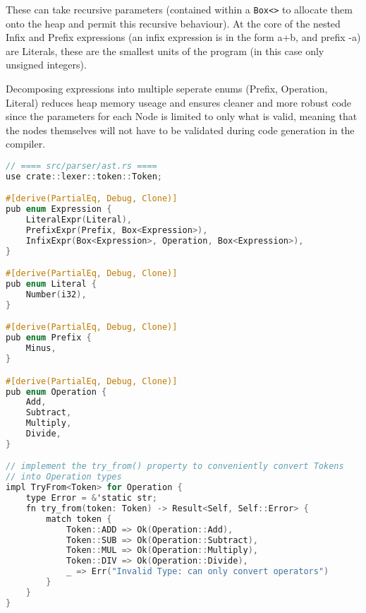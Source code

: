 These can take recursive parameters (contained within a \texttt{Box<>} to allocate them onto the heap and permit this recursive behaviour). At the core of the nested Infix and Prefix expressions (an infix expression is in the form a+b, and prefix -a) are Literals, these are the smallest units of the program (in this case only unsigned integers). 

Decomposing expressions into multiple seperate enums (Prefix, Operation, Literal) reduces heap memory useage and ensures cleaner and more robust code since the parameters for each Node is limited to only what is valid, meaning that the nodes themselves will not have to be validated during code generation in the compiler. 

\begin{lstlisting}[language=C]
// ==== src/parser/ast.rs ====
use crate::lexer::token::Token;

#[derive(PartialEq, Debug, Clone)]
pub enum Expression {
    LiteralExpr(Literal),
    PrefixExpr(Prefix, Box<Expression>),
    InfixExpr(Box<Expression>, Operation, Box<Expression>),
}

#[derive(PartialEq, Debug, Clone)]
pub enum Literal {
    Number(i32),
}

#[derive(PartialEq, Debug, Clone)]
pub enum Prefix {
    Minus,
}

#[derive(PartialEq, Debug, Clone)]
pub enum Operation {
    Add,
    Subtract,
    Multiply,
    Divide,
}

// implement the try_from() property to conveniently convert Tokens 
// into Operation types
impl TryFrom<Token> for Operation {
    type Error = &'static str;
    fn try_from(token: Token) -> Result<Self, Self::Error> {
        match token {
            Token::ADD => Ok(Operation::Add),
            Token::SUB => Ok(Operation::Subtract),
            Token::MUL => Ok(Operation::Multiply),
            Token::DIV => Ok(Operation::Divide),
            _ => Err("Invalid Type: can only convert operators")
        } 
    }
} 
\end{lstlisting}


